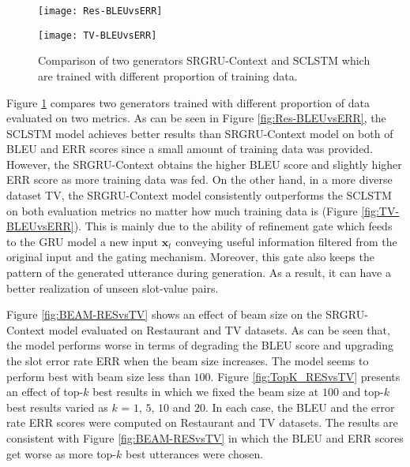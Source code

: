 \documentclass{llncs}
\begin{document}
\begin{figure}
	\centering
    \begin{minipage}{0.5\textwidth}
      \centering
      \texttt{[image: Res-BLEUvsERR]}
      \label{fig:Res-BLEUvsERR}
	\end{minipage}\hfill
    \begin{minipage}{0.5\textwidth}
      \centering
      \texttt{[image: TV-BLEUvsERR]}
      \label{fig:TV-BLEUvsERR} 
    \end{minipage}
\caption{Comparison of two generators SRGRU-Context and SCLSTM which are trained with different proportion of training data.}   
\label{fig:comparison-2models}
\end{figure}

Figure \ref{fig:comparison-2models} compares two generators trained with different proportion of data evaluated on two metrics. As can be seen in Figure \ref{fig:Res-BLEUvsERR}, the SCLSTM model achieves better results than SRGRU-Context model on both of BLEU and ERR scores since a small amount of training data was provided. However, the SRGRU-Context obtains the higher BLEU score and slightly higher ERR score as more training data was fed. On the other hand, in a more diverse dataset TV, the SRGRU-Context model consistently outperforms the SCLSTM on both evaluation metrics no matter how much training data is (Figure \ref{fig:TV-BLEUvsERR}). This is mainly due to the ability of refinement gate which feeds to the GRU model a new input $\textbf{x}_{t}$ conveying useful information filtered from the original input and the gating mechanism. Moreover, this gate also keeps the pattern of the generated utterance during generation. As a result, it can have a better realization of unseen slot-value pairs.

Figure \ref{fig:BEAM-RESvsTV} shows an effect of beam size on the SRGRU-Context model evaluated on Restaurant and TV datasets. As can be seen that, the model performs worse in terms of degrading the BLEU score and upgrading the slot error rate ERR when the beam size increases. The model seems to perform best with beam size less than $100$. Figure \ref{fig:TopK_RESvsTV} presents an effect of top-$k$ best results in which we fixed the beam size at $100$ and top-$k$ best results varied as $k$ = $1$, $5$, $10$ and $20$. In each case, the BLEU and the error rate ERR scores were computed on Restaurant and TV datasets. The results are consistent with Figure \ref{fig:BEAM-RESvsTV} in which the BLEU and ERR scores get worse as more top-$k$ best utterances were chosen.
\end{document}
